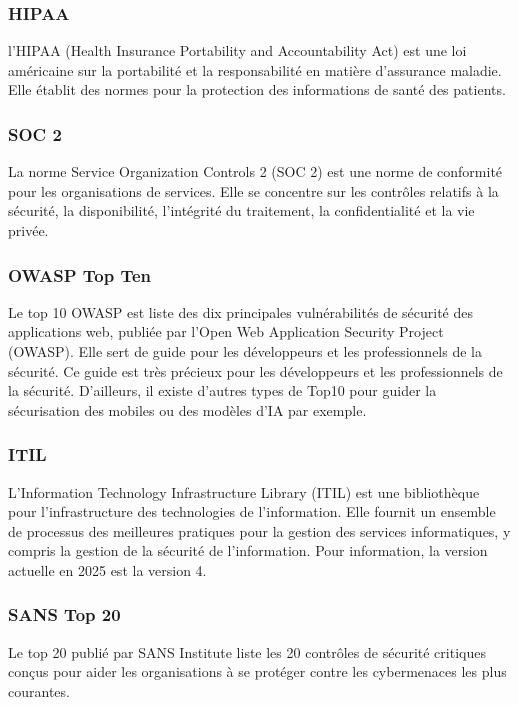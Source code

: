 \subsubsection{HIPAA}
l'HIPAA (Health Insurance Portability and Accountability Act) est une loi américaine sur la portabilité et la responsabilité en matière d'assurance maladie. Elle établit des normes pour la protection des informations de santé des patients.
	
\subsubsection{SOC 2}
La norme Service Organization Controls 2 (SOC 2) est une norme de conformité pour les organisations de services. Elle se concentre sur les contrôles relatifs à la sécurité, la disponibilité, l'intégrité du traitement, la confidentialité et la vie privée.
	
\subsubsection{OWASP Top Ten}
Le top 10 OWASP est liste des dix principales vulnérabilités de sécurité des applications web, publiée par l'Open Web Application Security Project (OWASP). Elle sert de guide pour les développeurs et les professionnels de la sécurité. Ce guide est très précieux pour les développeurs et les professionnels de la sécurité. D'ailleurs, il existe d'autres types de Top10 pour guider la sécurisation des mobiles ou des modèles d'IA par exemple.
	
\subsubsection{ITIL}
L'Information Technology Infrastructure Library (ITIL) est une bibliothèque pour l'infrastructure des technologies de l'information. Elle fournit un ensemble de processus des meilleures pratiques pour la gestion des services informatiques, y compris la gestion de la sécurité de l'information. Pour information, la version actuelle en 2025 est la version 4.
	
\subsubsection{SANS Top 20}
Le top 20 publié par SANS Institute liste les 20 contrôles de sécurité critiques conçus pour aider les organisations à se protéger contre les cybermenaces les plus courantes.

